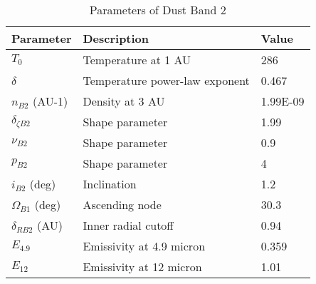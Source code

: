 \documentclass[a4paper,10pt]{article}
\begin{document}
\begin{table}[htbp]
\caption{Parameters of Dust Band 2}
\begin{tabular}{lll}
\hline
\textbf{Parameter} & \textbf{Description}           & \textbf{Value} \\ \hline
$T_0$                 & Temperature at 1 AU            & 286            \\
$\delta$              & Temperature power-law exponent & 0.467          \\
$n_{B2}$ (AU-1)         & Density at 3 AU                & 1.99E-09       \\
$\delta_{\zeta B2}$      & Shape parameter                & 1.99           \\
$\nu_{B2}$              & Shape parameter                & 0.9            \\
$p_{B2}$               & Shape parameter                & 4              \\
$i_{B2}$ (deg)         & Inclination                    & 1.2            \\
$\Omega_{B1}$ (deg)     & Ascending node                 & 30.3           \\
$\delta_{R B2}$ (AU)    & Inner radial cutoff            & 0.94           \\
$E_{4.9}$               & Emissivity at 4.9 micron       & 0.359          \\
$E_{12}$                & Emissivity at 12 micron        & 1.01           \\ \hline
\end{tabular}
\end{table}
\end{document}
